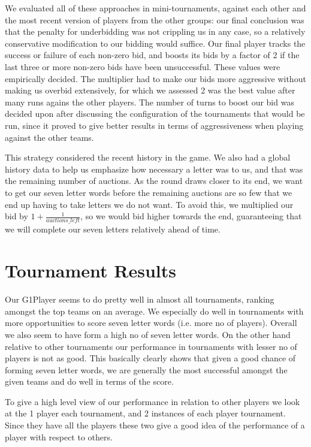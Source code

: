 \documentclass[11pt]{article}
\begin{document}
We evaluated all of these approaches in mini-tournaments, against each other and the most recent version of players from the other groups: our final conclusion was that the penalty for underbidding was not crippling us in any case, so a relatively conservative modification to our bidding would suffice.  Our final player tracks the success or failure of each non-zero bid, and boosts its bids by a factor of 2 if the last three or more non-zero bids have been unsuccessful. These values were empirically decided. The multiplier had to make our bids more aggressive without making us overbid extensively, for which we assessed 2 was the best value after many runs agains the other players. The number of turns to boost our bid was decided upon after discussing the configuration of the tournaments that would be run, since it proved to give better results in terms of aggressiveness when playing against the other teams. 

This strategy considered the recent history in the game. We also had a global history data to help us emphasize how necessary a letter was to us, and that was the remaining number of auctions. As the round draws closer to its end, we want to get our seven letter words before the remaining auctions are so few that we end up having to take letters we do not want. To avoid this, we multiplied our bid by $1+\frac{1}{auctions\_left}$, so we would bid higher towards the end, guaranteeing that we will complete our seven letters relatively ahead of time.


\section{Tournament Results} %
	Our G1Player seems to do pretty well in almost all tournaments, ranking amongst the top teams on an average. We especially do well in tournaments with more opportunities to score seven letter words (i.e. more no of players). Overall we also seem to have form a high no of seven letter words. On the other hand relative to other tournaments our performance in tournaments with lesser no of players is not as good. This basically clearly shows that given a good chance of forming seven letter words, we are generally the most successful amongst the given teams and do well in terms of the score.
	
	To give a high level view of our performance in relation to other players we look at the 1 player each tournament, and 2 instances of each player tournament. Since they have all the players these two give a good idea of the performance of a player with respect to others. 
	
\end{document}
